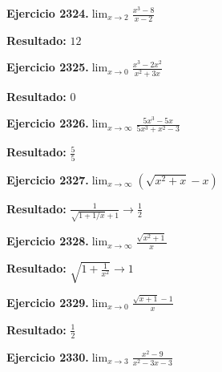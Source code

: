 \documentclass[10pt,a4paper]{article}
\begin{document}
\newpage
\begin{ejbox}
\textbf{Ejercicio 2324.}\quad $\lim_{x\to 2} \frac{x^3-8}{x-2}$
\end{ejbox}

\begin{solbox}
\textbf{Resultado:} \(\displaystyle 12\)
\end{solbox}

\begin{ejbox}
\textbf{Ejercicio 2325.}\quad $\lim_{x\to 0} \frac{x^3-2x^2}{x^2+3x}$
\end{ejbox}

\begin{solbox}
\textbf{Resultado:} \(\displaystyle 0\)
\end{solbox}

\begin{ejbox}
\textbf{Ejercicio 2326.}\quad $\lim_{x\to \infty} \frac{5x^3 - 5x}{5x^3 + x^2 - 3}$
\end{ejbox}

\begin{solbox}
\textbf{Resultado:} \(\displaystyle \frac{5}{5}\)
\end{solbox}

\newpage
\begin{ejbox}
\textbf{Ejercicio 2327.}\quad $\lim_{x\to \infty} (\sqrt{x^2+x} - x)$
\end{ejbox}

\begin{solbox}
\textbf{Resultado:} \(\displaystyle \frac{1}{\sqrt{1+1/x}+1} \to \frac{1}{2}\)
\end{solbox}

\begin{ejbox}
\textbf{Ejercicio 2328.}\quad $\lim_{x\to \infty} \frac{\sqrt{x^2+1}}{x}$
\end{ejbox}

\begin{solbox}
\textbf{Resultado:} \(\displaystyle \sqrt{1+\frac{1}{x^2}} \to 1\)
\end{solbox}

\begin{ejbox}
\textbf{Ejercicio 2329.}\quad $\lim_{x\to 0} \frac{\sqrt{x+1}-1}{x}$
\end{ejbox}

\begin{solbox}
\textbf{Resultado:} \(\displaystyle \frac{1}{2}\)
\end{solbox}

\newpage
\begin{ejbox}
\textbf{Ejercicio 2330.}\quad $\lim_{x\to 3} \frac{x^2-9}{x^2-3x-3}$
\end{ejbox}
\end{document}
